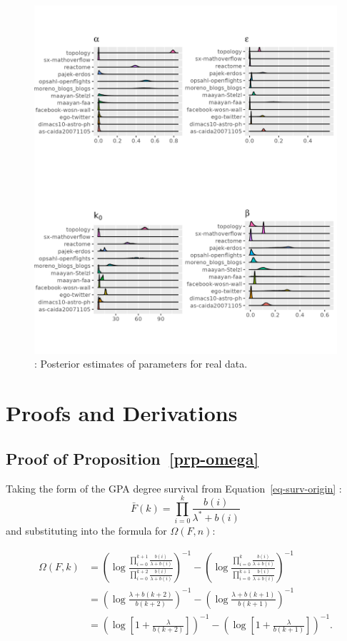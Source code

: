 \documentclass[
  sn-basic,
]{sn-jnl}
\theoremstyle{plain}
\theoremstyle{plain}
\theoremstyle{remark}
\begin{document}
\begin{figure}[H]

{\centering \includegraphics[width=0.8\linewidth,height=\textheight,keepaspectratio]{images/pars_plot.png}

}

\caption{: Posterior estimates of parameters for real data.}

\end{figure}%

\section{Proofs and Derivations}\label{sec-proofs}

\subsection{\texorpdfstring{Proof of
Proposition~\ref{prp-omega}}{Proof of Proposition~}}\label{proof-of-prp-omega}

Taking the form of the GPA degree survival from
Equation~\ref{eq-surv-origin} : \[
\bar F(k) = \prod_{i=0}^k\frac{b(i)}{\lambda^*+b(i)}
\] and substituting into the formula for \(\Omega(F,n)\):

\begin{align*}
\Omega(F,k)&=\left(\log\frac{\prod_{i=0}^{k+1}\frac{b(i)}{\lambda+b(i)}}{\prod_{i=0}^{k+2}\frac{b(i)}{\lambda+b(i)}}\right)^{-1}-\left(\log\frac{\prod_{i=0}^{k}\frac{b(i)}{\lambda+b(i)}}{\prod_{i=0}^{k+1}\frac{b(i)}{\lambda+b(i)}}\right)^{-1}\\
&=\left(\log\frac{\lambda+b(k+2)}{b(k+2)}\right)^{-1}-\left(\log\frac{\lambda+b(k+1)}{b(k+1)}\right)^{-1}\\
&=\left(\log\left[1+\frac{\lambda}{b(k+2)}\right]\right)^{-1}-\left(\log\left[1+\frac{\lambda}{b(k+1)}\right]\right)^{-1}.
\end{align*}
\end{document}
